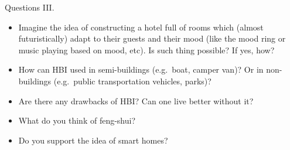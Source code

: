 \documentclass[10pt]{beamer}
\begin{document}
\begin{frame}{Questions III.}
	\begin{itemize}
        \pause{}
		\item Imagine the idea of constructing a hotel full of rooms which (almost futuristically) adapt to their guests and their mood (like the mood ring or music playing based on mood, etc). Is such thing possible? If yes, how?
		\pause{}
    \item How can HBI used in semi-buildings (e.g.\ boat, camper van)? Or in non-buildings (e.g.\ public transportation vehicles, parks)?
		\pause{}
		\item Are there any drawbacks of HBI\@? Can one live better without it?
		\pause{}
		\item What do you think of feng-shui?
		\pause{}
		\item Do you support the idea of smart homes?
	\end{itemize}	
\end{frame}

  

\end{document}
